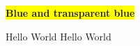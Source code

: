 \documentclass[12pt]{article}
\begin{document}
\colorbox{yellow}{%
    \bfseries
    \color{blue}%
    Blue and %
    transparent blue%
}
 
\bigskip
Hello World
Hello World
\end{document}

